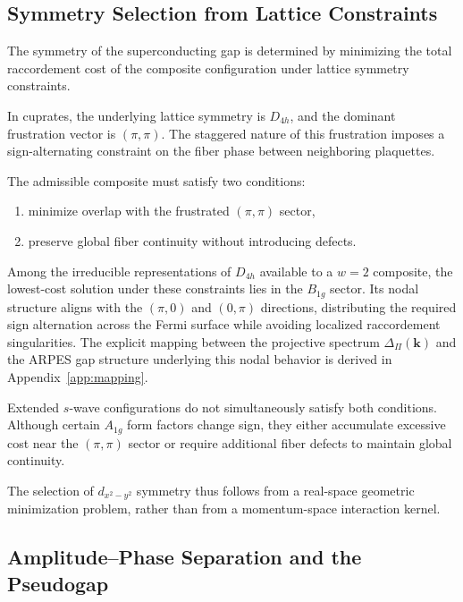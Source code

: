   \subsection{Symmetry Selection from Lattice Constraints}
    \label{subsec:symmetry-selection}

    The symmetry of the superconducting gap
    is determined by minimizing the total raccordement cost
    of the composite configuration
    under lattice symmetry constraints.

    In cuprates,
    the underlying lattice symmetry is $D_{4h}$,
    and the dominant frustration vector
    is $(\pi,\pi)$.
    The staggered nature of this frustration
    imposes a sign-alternating constraint
    on the fiber phase between neighboring plaquettes.

    The admissible composite must satisfy two conditions:
    \begin{enumerate}
      \item minimize overlap with the frustrated $(\pi,\pi)$ sector,
      \item preserve global fiber continuity without introducing defects.
    \end{enumerate}

    Among the irreducible representations of $D_{4h}$
    available to a $w=2$ composite,
    the lowest-cost solution under these constraints
    lies in the $B_{1g}$ sector.
    Its nodal structure aligns with the
    $(\pi,0)$ and $(0,\pi)$ directions,
    distributing the required sign alternation
    across the Fermi surface
    while avoiding localized raccordement singularities.
    The explicit mapping between the projective spectrum
    $\Delta_\Pi(\mathbf{k})$ and the ARPES gap structure
    underlying this nodal behavior
    is derived in Appendix~\ref{app:mapping}.

    Extended $s$-wave configurations
    do not simultaneously satisfy both conditions.
    Although certain $A_{1g}$ form factors change sign,
    they either accumulate excessive cost
    near the $(\pi,\pi)$ sector
    or require additional fiber defects
    to maintain global continuity.

    The selection of $d_{x^2-y^2}$ symmetry
    thus follows from a real-space geometric minimization problem,
    rather than from a momentum-space interaction kernel.

  \subsection{Amplitude--Phase Separation and the Pseudogap}
    \label{subsec:amplitude-phase}

